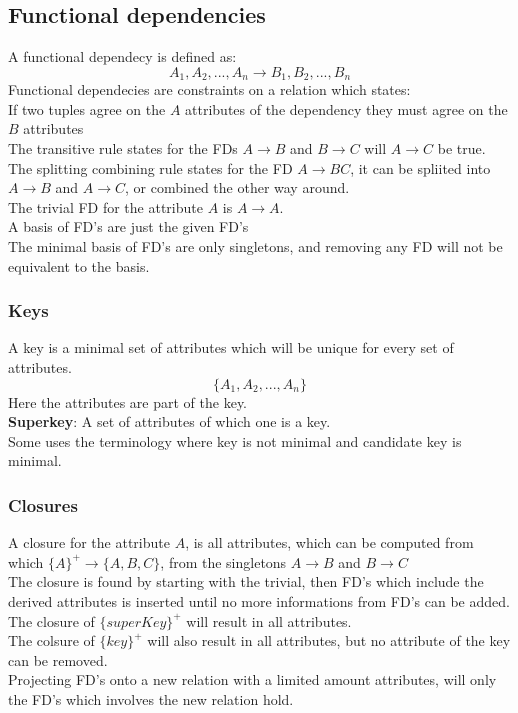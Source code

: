 \documentclass[12pt, a4paper]{article}
\begin{document}
		\subsection{Functional dependencies}
			A functional dependecy is defined as:
			$$A_1,A_2,...,A_n \rightarrow B_1,B_2,...,B_n$$
			Functional dependecies are constraints on a relation which states: \\
			If two tuples agree on the $A$ attributes of the dependency they must agree on the $B$ attributes\\
			The transitive rule states for the FDs $A\rightarrow B$ and $B\rightarrow C$ will $A\rightarrow C$ be true.\\
			The splitting combining rule states for the FD $A\rightarrow BC$, it can be spliited into $A\rightarrow B$ and $A\rightarrow C$, or combined the other way around.\\
			The trivial FD for the attribute $A$ is $A\rightarrow A$.\\
			A basis of FD's are just the given FD's\\
			The minimal basis of FD's are only singletons, and removing any FD will not be equivalent to the basis.\\ 
		\subsubsection{Keys}
			A key is a minimal set of attributes which will be unique for every set of attributes.\\
			$$\{A_1,A_2,...,A_n\}$$
			Here the attributes are part of the key.\\
			\textbf{Superkey}: A set of attributes of which one is a key.\\
			Some uses the terminology where key is not minimal and candidate key is minimal.\\
		\subsubsection{Closures}
				  A closure for the attribute $A$, is all attributes, which can be computed from which $\{A\}^+\rightarrow \{A,B,C\}$, from the singletons $A\rightarrow B$ and $B\rightarrow C$\\
				  The closure is found by starting with the trivial, then FD's which include the derived attributes is inserted until no more informations from FD's can be added.\\
				  The closure of $\{superKey\}^+$ will result in all attributes.\\
				  The colsure of $\{key\}^+$ will also result in all attributes, but no attribute of the key can be removed.\\
				  Projecting FD's onto a new relation with a limited amount attributes, will only the FD's which involves the new relation hold.
\end{document}
